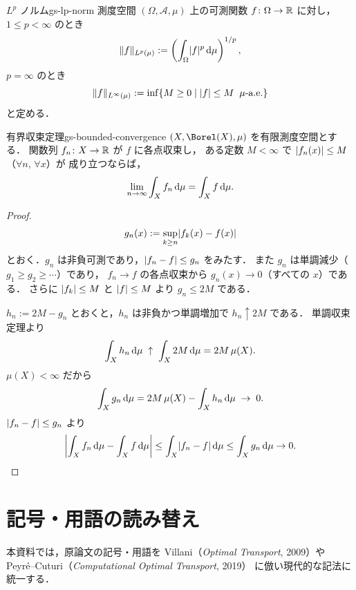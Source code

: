 \begin{definition}{$L^p$ ノルム}{gs-lp-norm}
  測度空間 $(\Omega,\mathcal{A},\mu)$ 上の可測関数 $f\colon\Omega\to\mathbb{R}$ に対し，
  $1\leq p<\infty$ のとき
  \[
    \lVert f \rVert_{L^p(\mu)}
    :=
    \left(\int_\Omega\lvert f \rvert^p\,\mathrm{d}\mu\right)^{1/p},
  \]
  $p=\infty$ のとき
  \[
    \lVert f \rVert_{L^\infty(\mu)}
    :=
    \inf\{M\geq 0\mid \lvert f \rvert\leq M\;\;\mu\text{-a.e.}\}
  \]
  と定める．
\end{definition}

\begin{theorem}{有界収束定理}{gs-bounded-convergence}
  $(X,\Borel(X),\mu)$ を有限測度空間とする．
  関数列 $f_n\colon X\to\mathbb{R}$ が $f$ に各点収束し，
  ある定数 $M<\infty$ で $\lvert f_n(x) \rvert\leq M$（$\forall n,\,\forall x$）が
  成り立つならば，
  \[
    \lim_{n\to\infty}\int_X f_n\,\mathrm{d}\mu=\int_X f\,\mathrm{d}\mu.
  \]
\end{theorem}

\begin{proof}
  \[
    g_n(x) := \sup_{k \geq n} \lvert f_k(x) - f(x) \rvert
  \]
  とおく．$g_n$ は非負可測であり，$\lvert f_n - f \rvert \leq g_n$ をみたす．
  また $g_n$ は単調減少（$g_1 \geq g_2 \geq \cdots$）であり，
  $f_n \to f$ の各点収束から $g_n(x) \to 0$（すべての $x$）である．
  さらに $\lvert f_k \rvert \leq M$ と $\lvert f \rvert \leq M$ より $g_n \leq 2M$ である．

  $h_n := 2M - g_n$ とおくと，$h_n$ は非負かつ単調増加で
  $h_n \uparrow 2M$ である．
  単調収束定理より
  \[
    \int_X h_n \, \mathrm{d}\mu
    \;\uparrow\;
    \int_X 2M \, \mathrm{d}\mu
    = 2M \, \mu(X).
  \]
  $\mu(X) < \infty$ だから
  \[
    \int_X g_n \, \mathrm{d}\mu
    = 2M \, \mu(X) - \int_X h_n \, \mathrm{d}\mu
    \;\to\; 0.
  \]
  $\lvert f_n - f \rvert \leq g_n$ より
  \[
    \left\lvert\int_X f_n \, \mathrm{d}\mu - \int_X f \, \mathrm{d}\mu\right\rvert
    \leq \int_X \lvert f_n - f \rvert \, \mathrm{d}\mu
    \leq \int_X g_n \, \mathrm{d}\mu
    \to 0.  \qedhere
  \]
\end{proof}

\section*{記号・用語の読み替え}

本資料では，原論文の記号・用語を
Villani（\emph{Optimal Transport}, 2009）や
Peyré–Cuturi（\emph{Computational Optimal Transport}, 2019）
に倣い現代的な記法に統一する．

